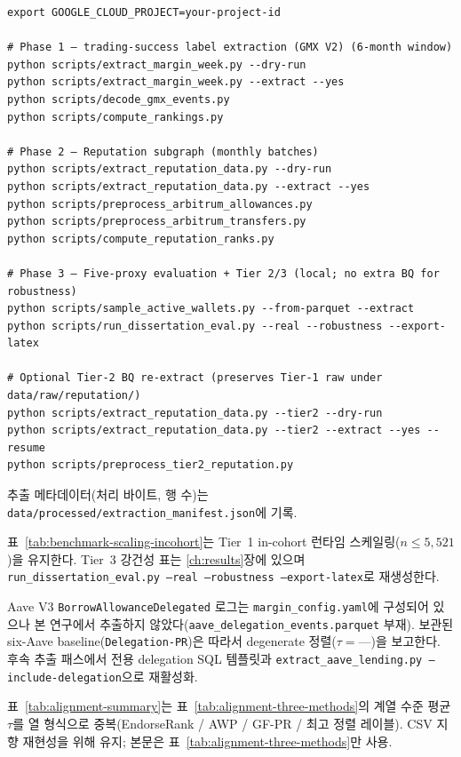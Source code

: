 \begin{verbatim}
export GOOGLE_CLOUD_PROJECT=your-project-id

# Phase 1 — trading-success label extraction (GMX V2) (6-month window)
python scripts/extract_margin_week.py --dry-run
python scripts/extract_margin_week.py --extract --yes
python scripts/decode_gmx_events.py
python scripts/compute_rankings.py

# Phase 2 — Reputation subgraph (monthly batches)
python scripts/extract_reputation_data.py --dry-run
python scripts/extract_reputation_data.py --extract --yes
python scripts/preprocess_arbitrum_allowances.py
python scripts/preprocess_arbitrum_transfers.py
python scripts/compute_reputation_ranks.py

# Phase 3 — Five-proxy evaluation + Tier 2/3 (local; no extra BQ for robustness)
python scripts/sample_active_wallets.py --from-parquet --extract
python scripts/run_dissertation_eval.py --real --robustness --export-latex

# Optional Tier-2 BQ re-extract (preserves Tier-1 raw under data/raw/reputation/)
python scripts/extract_reputation_data.py --tier2 --dry-run
python scripts/extract_reputation_data.py --tier2 --extract --yes --resume
python scripts/preprocess_tier2_reputation.py
\end{verbatim}

추출 메타데이터(처리 바이트, 행 수)는 \texttt{data/processed/extraction\_manifest.json}에 기록.


표~\ref{tab:benchmark-scaling-incohort}는 Tier~1 in-cohort 런타임 스케일링($n \leq 5{,}521$)을 유지한다. Tier~3 강건성 표는 \ref{ch:results}장에 있으며 \texttt{run\_dissertation\_eval.py --real --robustness --export-latex}로 재생성한다.




Aave V3 \texttt{BorrowAllowanceDelegated} 로그는 \texttt{margin\_config.yaml}에 구성되어 있으나 본 연구에서 추출하지 않았다(\texttt{aave\_delegation\_events.parquet} 부재). 보관된 six-Aave baseline(\texttt{Delegation-PR})은 따라서 degenerate 정렬($\tau = \text{---}$)을 보고한다. 후속 추출 패스에서 전용 delegation SQL 템플릿과 \texttt{extract\_aave\_lending.py --include-delegation}으로 재활성화.


표~\ref{tab:alignment-summary}는 표~\ref{tab:alignment-three-methods}의 계열 수준 평균 $\tau$를 열 형식으로 중복(EndorseRank / AWP / GF-PR / 최고 정렬 레이블). CSV 지향 재현성을 위해 유지; 본문은 표~\ref{tab:alignment-three-methods}만 사용.



